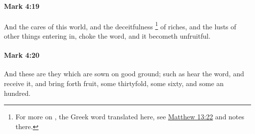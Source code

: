 		\paragraph{Mark 4:19} %
			\label{MARK-4-19}

			And the cares of this world, and the deceitfulness%
				\footnote{%
					For more on , the Greek word translated here, see \hyperref[MATTHEW-13-22]{Matthew 13:22} and notes there.
					}
			of riches, and the lusts of other things entering in, choke the word, and it becometh unfruitful.

			\begin{framed}
			\scriptsize
				\begin{compactdesc}
					\item[SBLG] 
				\end{compactdesc}
			\end{framed}

		\paragraph{Mark 4:20} %
			\label{MARK-4-20}

			And these are they which are sown on good ground; such as hear the word, and receive it, and bring forth fruit, some thirtyfold, some sixty, and some an hundred.

